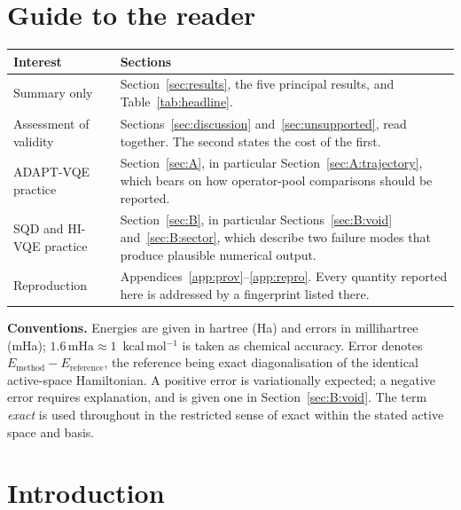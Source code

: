 \documentclass[11pt,a4paper]{article}
\newcommand{\mHa}{\ensuremath{\,\mathrm{mHa}}}
\begin{document}
\section*{Guide to the reader}

\begin{center}
\small
\begin{tabular}{@{}p{3.3cm}p{11.4cm}@{}}
\toprule
\textbf{Interest} & \textbf{Sections} \\
\midrule
Summary only &
Section~\ref{sec:results}, the five principal results, and
Table~\ref{tab:headline}. \\[3pt]
Assessment of validity &
Sections~\ref{sec:discussion} and~\ref{sec:unsupported}, read together. The
second states the cost of the first. \\[3pt]
ADAPT-VQE practice &
Section~\ref{sec:A}, in particular
Section~\ref{sec:A:trajectory}, which bears on how operator-pool comparisons
should be reported. \\[3pt]
SQD and HI-VQE practice &
Section~\ref{sec:B}, in particular Sections~\ref{sec:B:void}
and~\ref{sec:B:sector}, which describe two failure modes that produce
plausible numerical output. \\[3pt]
Reproduction &
Appendices~\ref{app:prov}--\ref{app:repro}. Every quantity reported here is
addressed by a fingerprint listed there. \\
\bottomrule
\end{tabular}
\end{center}

\vspace{0.2em}
\noindent\textbf{Conventions.} Energies are given in hartree (Ha) and errors in
millihartree (mHa); $1.6\mHa \approx 1$~kcal\,mol$^{-1}$ is taken as chemical
accuracy. Error denotes $E_{\text{method}} - E_{\text{reference}}$, the
reference being exact diagonalisation of the identical active-space
Hamiltonian. A positive error is variationally expected; a negative error
requires explanation, and is given one in Section~\ref{sec:B:void}. The term
\emph{exact} is used throughout in the restricted sense of exact within the
stated active space and basis.

\vspace{0.8em}
\tableofcontents

\section{Introduction}
\label{sec:intro}
\end{document}

